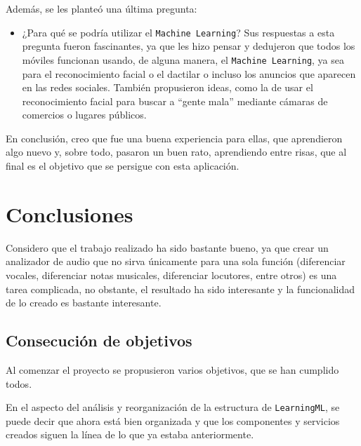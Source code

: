 \documentclass[a4paper, 12pt]{book}
\begin{document}
Además, se les planteó una última pregunta:

\begin{itemize}
	\item ¿Para qué se podría utilizar el \texttt{Machine Learning}? Sus respuestas a esta pregunta fueron fascinantes, ya que les hizo pensar y dedujeron que todos los móviles funcionan usando, de alguna manera, el \texttt{Machine Learning}, ya sea para el reconocimiento facial o el dactilar o incluso los anuncios que aparecen en las redes sociales. También propusieron ideas, como la de usar el reconocimiento facial para buscar a ``gente mala'' mediante cámaras de comercios o lugares públicos.
\end{itemize}

En conclusión, creo que fue una buena experiencia para ellas, que aprendieron algo nuevo y, sobre todo, pasaron un buen rato, aprendiendo entre risas, que al final es el objetivo que se persigue con esta aplicación.




\cleardoublepage
\chapter{Conclusiones}
\label{chap:conclusiones}

Considero que el trabajo realizado ha sido bastante bueno, ya que crear un analizador de audio que no sirva únicamente para una sola función (diferenciar vocales, diferenciar notas musicales, diferenciar locutores, entre otros) es una tarea complicada, no obstante, el resultado ha sido interesante y la funcionalidad de lo creado es bastante interesante.

\section{Consecución de objetivos}
\label{sec:consecucion-objetivos}

Al comenzar el proyecto se propusieron varios objetivos, que se han cumplido todos.

En el aspecto del análisis y reorganización de la estructura de \texttt{LearningML}, se puede decir que ahora está bien organizada y que los componentes y servicios creados siguen la línea de lo que ya estaba anteriormente.
\end{document}
